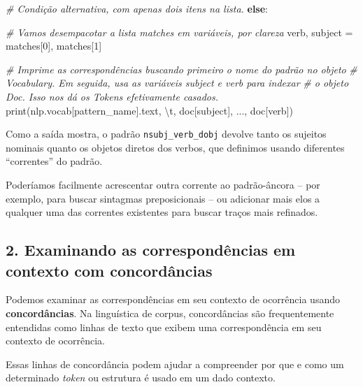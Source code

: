 \documentclass[
  brazilian,
]{article}
\newenvironment{Shaded}{}{}
\newcommand{\BuiltInTok}[1]{#1}
\newcommand{\CharTok}[1]{\textcolor[rgb]{0.25,0.44,0.63}{#1}}
\newcommand{\CommentTok}[1]{\textcolor[rgb]{0.38,0.63,0.69}{\textit{#1}}}
\newcommand{\ControlFlowTok}[1]{\textcolor[rgb]{0.00,0.44,0.13}{\textbf{#1}}}
\newcommand{\DecValTok}[1]{\textcolor[rgb]{0.25,0.63,0.44}{#1}}
\newcommand{\NormalTok}[1]{#1}
\newcommand{\OperatorTok}[1]{\textcolor[rgb]{0.40,0.40,0.40}{#1}}
\newcommand{\StringTok}[1]{\textcolor[rgb]{0.25,0.44,0.63}{#1}}
\begin{document}
\begin{Shaded}
\begin{Highlighting}[]
    \CommentTok{\# Condição alternativa, com apenas dois itens na lista.}
    \ControlFlowTok{else}\NormalTok{:}

        \CommentTok{\# Vamos desempacotar a lista \textquotesingle{}matches\textquotesingle{} em variáveis, por clareza}
\NormalTok{        verb, subject }\OperatorTok{=}\NormalTok{ matches[}\DecValTok{0}\NormalTok{], matches[}\DecValTok{1}\NormalTok{]}

        \CommentTok{\# Imprime as correspondências buscando primeiro o nome do padrão no objeto}
        \CommentTok{\# Vocabulary. Em seguida, usa as variáveis \textquotesingle{}subject\textquotesingle{} e \textquotesingle{}verb\textquotesingle{} para indexar}
        \CommentTok{\# o objeto Doc. Isso nos dá os Tokens efetivamente casados.}
        \BuiltInTok{print}\NormalTok{(nlp.vocab[pattern\_name].text, }\StringTok{\textquotesingle{}}\CharTok{\textbackslash{}t}\StringTok{\textquotesingle{}}\NormalTok{, doc[subject], }\StringTok{\textquotesingle{}...\textquotesingle{}}\NormalTok{, doc[verb])}
\end{Highlighting}
\end{Shaded}

Como a saída mostra, o padrão \texttt{nsubj\_verb\_dobj} devolve tanto
os sujeitos nominais quanto os objetos diretos dos verbos, que definimos
usando diferentes ``correntes'' do padrão.

Poderíamos facilmente acrescentar outra corrente ao padrão-âncora -- por
exemplo, para buscar sintagmas preposicionais -- ou adicionar mais elos
a qualquer uma das correntes existentes para buscar traços mais
refinados.

\hypertarget{examinando-as-corresponduxeancias-em-contexto-com-concorduxe2ncias}{%
\subsection{2. Examinando as correspondências em contexto com
concordâncias}\label{examinando-as-corresponduxeancias-em-contexto-com-concorduxe2ncias}}

Podemos examinar as correspondências em seu contexto de ocorrência
usando \textbf{concordâncias}. Na linguística de corpus, concordâncias
são frequentemente entendidas como linhas de texto que exibem uma
correspondência em seu contexto de ocorrência.

Essas linhas de concordância podem ajudar a compreender por que e como
um determinado \emph{token} ou estrutura é usado em um dado contexto.
\end{document}

